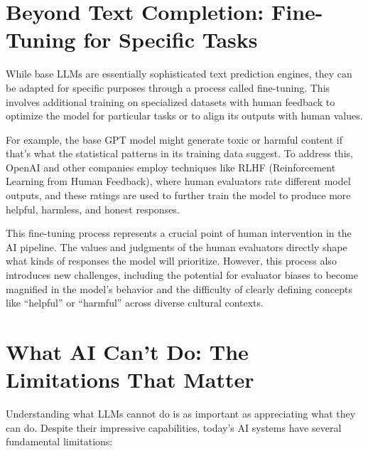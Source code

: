\documentclass[
  Letterpaper,
]{scrbook}
\begin{document}
\section{Beyond Text Completion: Fine-Tuning for Specific
Tasks}\label{beyond-text-completion-fine-tuning-for-specific-tasks}

While base LLMs are essentially sophisticated text prediction engines,
they can be adapted for specific purposes through a process called
fine-tuning. This involves additional training on specialized datasets
with human feedback to optimize the model for particular tasks or to
align its outputs with human values.

For example, the base GPT model might generate toxic or harmful content
if that's what the statistical patterns in its training data suggest. To
address this, OpenAI and other companies employ techniques like RLHF
(Reinforcement Learning from Human Feedback), where human evaluators
rate different model outputs, and these ratings are used to further
train the model to produce more helpful, harmless, and honest responses.

This fine-tuning process represents a crucial point of human
intervention in the AI pipeline. The values and judgments of the human
evaluators directly shape what kinds of responses the model will
prioritize. However, this process also introduces new challenges,
including the potential for evaluator biases to become magnified in the
model's behavior and the difficulty of clearly defining concepts like
``helpful'' or ``harmful'' across diverse cultural contexts.

\section{What AI Can't Do: The Limitations That
Matter}\label{what-ai-cant-do-the-limitations-that-matter}

Understanding what LLMs cannot do is as important as appreciating what
they can do. Despite their impressive capabilities, today's AI systems
have several fundamental limitations:
\end{document}
